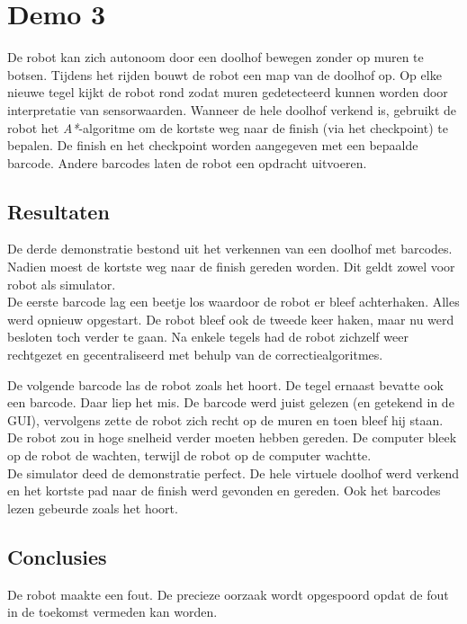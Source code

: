 \documentclass[t1]{penoverslag}
\begin{document}
\section{Demo 3} %
\label{Asec:demo3}
De robot kan zich autonoom door een doolhof bewegen zonder op muren te botsen. Tijdens het rijden bouwt de robot een map van de doolhof op. Op elke nieuwe tegel kijkt de robot rond zodat muren gedetecteerd kunnen worden door interpretatie van sensorwaarden. Wanneer de hele doolhof verkend is, gebruikt de robot het \textit{A*}-algoritme om de kortste weg naar de finish (via het checkpoint) te bepalen. De finish en het checkpoint worden aangegeven met een bepaalde barcode. Andere barcodes laten de robot een opdracht uitvoeren.

\subsection{Resultaten} %
\label{Assec:result3}
De derde demonstratie bestond uit het verkennen van een doolhof met barcodes. Nadien moest de kortste weg naar de finish gereden worden. Dit geldt zowel voor robot als simulator.\\

De eerste barcode lag een beetje los waardoor de robot er bleef achterhaken. Alles werd opnieuw opgestart. De robot bleef ook de tweede keer haken, maar nu werd besloten toch verder te gaan. Na enkele tegels had de robot zichzelf weer rechtgezet en gecentraliseerd met behulp van de correctiealgoritmes.

De volgende barcode las de robot zoals het hoort. De tegel ernaast bevatte ook een barcode. Daar liep het mis. De barcode werd juist gelezen (en getekend in de GUI), vervolgens zette de robot zich recht op de muren en toen bleef hij staan. De robot zou in hoge snelheid verder moeten hebben gereden. De computer bleek op de robot de wachten, terwijl de robot op de computer wachtte.\\

De simulator deed de demonstratie perfect. De hele virtuele doolhof werd verkend en het kortste pad naar de finish werd gevonden en gereden. Ook het barcodes lezen gebeurde zoals het hoort.

\subsection{Conclusies} %
\label{Assec:conc3}
De robot maakte een fout. De precieze oorzaak wordt opgespoord opdat de fout in de toekomst vermeden kan worden.
\end{document}
